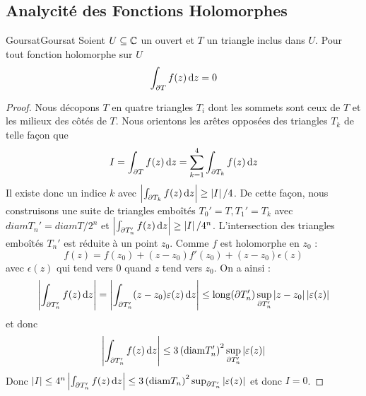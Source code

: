 \documentclass{cours}
\begin{document}
\subsection{Analycité des Fonctions Holomorphes}
\begin{lemme}{Goursat}{Goursat}
    Soient $U \subseteq \mathbb{C}$ un ouvert et $T$ un triangle inclus dans $U$. Pour tout fonction holomorphe sur $U$
    \[
        \int_{\partial T}f(z){\rm \, d} z = 0
    \]
\end{lemme}
\begin{proof}
    Nous décopons $T$ en quatre triangles $T_{i}$ dont les sommets sont ceux de $T$ et les milieux des côtés de $T$. Nous orientons les arêtes opposées des triangles $T_{k}$ de telle façon que 
    \[
        I = \int_{\partial T}f(z){\rm \, d} z = \sum_{k = 1}^{4}\int_{\partial T_{k}}f(z){\rm \, d} z
    \]
    Il existe donc un indice $k$ avec $\left|\int_{\partial T_{k}}f(z){\rm \, d} z\right| \geq \left|I\right|/4$. De cette façon, nous construisons une suite de triangles emboîtés $T_{0}' = T, T_{1}' = T_{k}$ avec $diam T_{n}' = diam T/2^{n}$ et $\left|\int_{\partial T_{n}'} f(z){\rm \, d} z\right| \geq \left|I\right|/4^{n}$.
	L'intersection des triangles emboîtés $T_{n}'$ est réduite à un point $z_{0}$. Comme $f$ est holomorphe en $z_{0}$ : 
	\[
		f(z) = f(z_{0}) + (z - z_{0})f'(z_{0}) + (z - z_{0})\epsilon(z)
	\]
	avec $\epsilon(z)$ qui tend vers $0$ quand $z$ tend vers $z_{0}$.  
	On a ainsi :
	\[
		\left|\int_{\partial T_{n}'} f(z){\rm \, d} z\right| = \left|\int_{\partial T_{n}'} (z - z_{0}) \varepsilon(z) {\rm \, d} z\right| \leq {\rm long}(\partial T_{n}') \sup_{\partial T_{n}'} \left|z - z_{0}\right|\left|\varepsilon(z)\right|
	\]
	et donc 
	\[
		\left|\int_{\partial T_{n}'} f(z){\rm \, d} z\right|\leq 3 \left({\rm diam}T_{n}'\right)^{2}\sup_{\partial T_{n}'}\left|\varepsilon(z)\right|
	\]
	Donc $\left|I\right| \leq 4^{n}\left|\int_{\partial T_{n}'} f(z) {\rm \, d} z\right| \leq 3 \left({\rm diam}T_{n}\right)^{2}\sup_{\partial T_{n}'}\left|\varepsilon(z)\right|$ et donc $I = 0$.
\end{proof}
\end{document}
